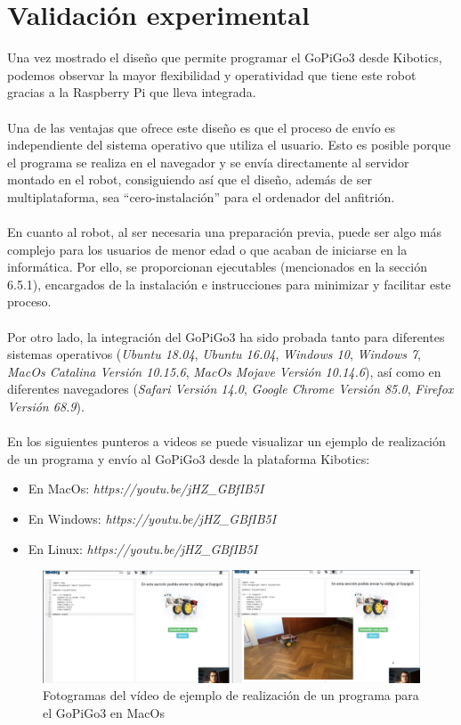\documentclass{report}
\begin{document}
\section{Validación experimental}

Una vez mostrado el diseño que permite programar el GoPiGo3 desde Kibotics, podemos observar la mayor flexibilidad y operatividad que tiene este robot gracias a la Raspberry Pi que lleva integrada.
\\
\\
Una de las ventajas que ofrece este diseño es que el proceso de envío es independiente del sistema operativo que utiliza el usuario. Esto es posible porque el programa se realiza en el navegador y se envía directamente al servidor montado en el robot, consiguiendo así que el diseño, además de ser multiplataforma, sea “cero-instalación” para el ordenador del anfitrión.
\\
\\
En cuanto al robot, al ser necesaria una preparación previa, puede ser algo más complejo para los usuarios de menor edad o que acaban de iniciarse en la informática. Por ello, se proporcionan ejecutables (mencionados en la sección 6.5.1), encargados de la instalación e instrucciones para minimizar y facilitar este proceso.
\\
\\
Por otro lado, la integración del GoPiGo3 ha sido probada tanto para diferentes sistemas operativos (\textit{Ubuntu 18.04}, \textit{Ubuntu 16.04}, \textit{Windows 10}, \textit{Windows 7}, \textit{MacOs Catalina Versión 10.15.6}, \textit{MacOs Mojave Versión 10.14.6}), así como en diferentes navegadores (\textit{Safari Versión 14.0}, \textit{Google Chrome Versión 85.0}, \textit{Firefox Versión 68.9}).
\\
\\
En los siguientes punteros a videos se puede visualizar un ejemplo de realización de un programa y envío al GoPiGo3 desde la plataforma Kibotics:
\begin{itemize}
	\item En MacOs: \textit{https://youtu.be/jHZ\_GBfIB5I}
	\item En Windows:  \textit{https://youtu.be/jHZ\_GBfIB5I}
	\item En Linux:  \textit{https://youtu.be/jHZ\_GBfIB5I}
\end{itemize}

\begin{figure}[h!]
  \centering
    \includegraphics[width=1\textwidth]{images/fotograma_ejercicio_GoPiGo.png}
  \caption{Fotogramas del vídeo de ejemplo de realización de un programa para el GoPiGo3 en MacOs}
  \label{Fotogramas del vídeo de ejemplo de realización de un programa para el GoPiGo3 en MacOs}
\end{figure}
\end{document}
